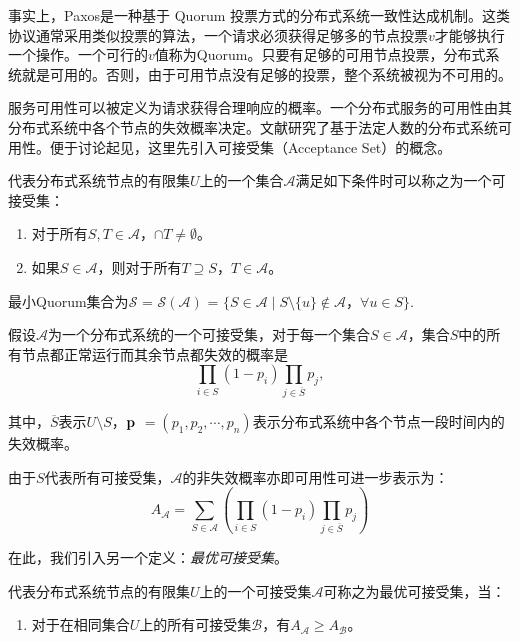事实上，Paxos是一种基于 Quorum 投票方式\cite{Gifford:1979:WVR:800215.806583}的分布式系统一致性达成机制。这类协议通常采用类似投票的算法，一个请求必须获得足够多的节点投票$v$才能够执行一个操作。一个可行的$v$值称为Quorum。只要有足够的可用节点投票，分布式系统就是可用的。否则，由于可用节点没有足够的投票，整个系统被视为不可用的。

服务可用性可以被定义为请求获得合理响应的概率。一个分布式服务的可用性由其分布式系统中各个节点的失效概率决定。文献\cite{Peleg1995210}研究了基于法定人数的分布式系统可用性。便于讨论起见，这里先引入可接受集（Acceptance Set）的概念\cite{Amir1998223}。

\begin{definition}
代表分布式系统节点的有限集$U$上的一个集合$\mathcal{A}$满足如下条件时可以称之为一个可接受集：
\begin{enumerate}[1)]
\item 对于所有$S, T \in \mathcal{A}$，$\cap T \neq \emptyset$。
\item 如果$S \in \mathcal{A}$，则对于所有$T \supseteq S$，$T \in \mathcal{A}$。
\end{enumerate}
最小Quorum集合为$\mathcal{S}$ = $\mathcal{S}(\mathcal{A})$ = $\{S \in \mathcal{A} \mid S \setminus \{u\} \notin \mathcal{A}$，$\forall u \in S\}$.
\end{definition}

假设$\mathcal{A}$为一个分布式系统的一个可接受集，对于每一个集合$S \in \mathcal{A}$，集合$S$中的所有节点都正常运行而其余节点都失效的概率是
\begin{equation}\nonumber
\prod_{i \in S} (1-p_i) \prod_{j \in \overline S} p_j,
\end{equation}

其中，$\overline S$表示$U \setminus S$，$\bf p$ $= (p_1, p_2, \cdots, p_n)$表示分布式系统中各个节点一段时间内的失效概率。

由于$S$代表所有可接受集，$\mathcal{A}$的非失效概率亦即可用性可进一步表示为：
\begin{equation}\label{eq_a_as}
A_{\mathcal{A}} = \sum_{S \in \mathcal{A}}(\prod_{i \in S} (1-p_i) \prod_{j \in \overline S} p_j)
\end{equation}

在此，我们引入另一个定义：\emph{最优可接受集}。
\begin{definition}
代表分布式系统节点的有限集$U$上的一个可接受集$\mathcal{A}$可称之为最优可接受集，当：
\begin{enumerate}[1)]
\item 对于在相同集合$U$上的所有可接受集$\mathcal{B}$，有$A_{\mathcal{A}} \geq A_{\mathcal{B}}$。
\end{enumerate}
\end{definition}

